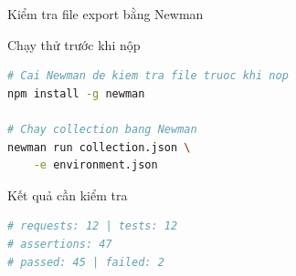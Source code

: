 \documentclass[aspectratio=169,10pt]{beamer}
\begin{document}
\begin{frame}[fragile]{Kiểm tra file export bằng Newman}
  \begin{block}{Chạy thử trước khi nộp}
\begin{lstlisting}[language=bash,style=nonumber]
# Cai Newman de kiem tra file truoc khi nop
npm install -g newman

# Chay collection bang Newman
newman run collection.json \
    -e environment.json
\end{lstlisting}
  \end{block}

  \begin{block}{Kết quả cần kiểm tra}
\begin{lstlisting}[language=bash,style=nonumber]
# requests: 12 | tests: 12
# assertions: 47
# passed: 45 | failed: 2
\end{lstlisting}
  \end{block}
\end{frame}
\end{document}
